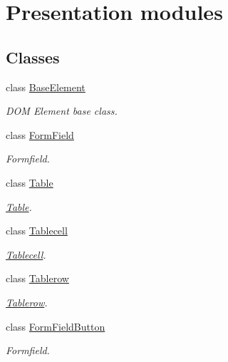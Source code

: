 \section{Presentation modules}
\label{group__OWL__UI__LAYER}
\subsection*{Classes}
\begin{DoxyCompactItemize}
\item 
class \hyperlink{classBaseElement}{BaseElement}
\begin{DoxyCompactList}\small\item\em DOM Element base class. \item\end{DoxyCompactList}\item 
class \hyperlink{classFormField}{FormField}
\begin{DoxyCompactList}\small\item\em Formfield. \item\end{DoxyCompactList}\item 
class \hyperlink{classTable}{Table}
\begin{DoxyCompactList}\small\item\em \hyperlink{classTable}{Table}. \item\end{DoxyCompactList}\item 
class \hyperlink{classTablecell}{Tablecell}
\begin{DoxyCompactList}\small\item\em \hyperlink{classTablecell}{Tablecell}. \item\end{DoxyCompactList}\item 
class \hyperlink{classTablerow}{Tablerow}
\begin{DoxyCompactList}\small\item\em \hyperlink{classTablerow}{Tablerow}. \item\end{DoxyCompactList}\item 
class \hyperlink{classFormFieldButton}{FormFieldButton}
\begin{DoxyCompactList}\small\item\em Formfield. \item\end{DoxyCompactList}\item 

\end{DoxyCompactItemize}
